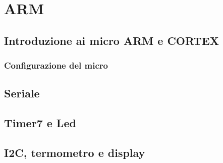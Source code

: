 \documentclass[main.tex]{subfiles}
\begin{document}
\chapter{ARM}
\section{Introduzione ai micro ARM e CORTEX}
\subsection{Configurazione del micro}
\section{Seriale}
\section{Timer7 e Led}
\section{I2C, termometro e display}
\end{document}
